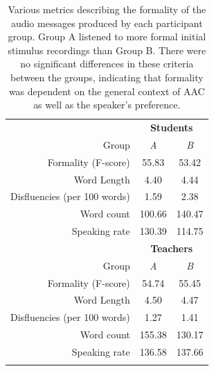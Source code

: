 \begin{table}
	\centering
	\begin{tabular}{r c c}
		\toprule
        & \multicolumn{2}{c}{\textbf{Students}} \\
        Group                        & \textit{A}    & \textit{B}   \\
        Formality (F-score)          & 55.83    & 53.42  \\
        Word Length                  & 4.40     & 4.44   \\
        Disfluencies (per 100 words) & 1.59     & 2.38   \\
        Word count                   & 100.66   & 140.47 \\
        Speaking rate                & 130.39   & 114.75 \\
        \midrule
        & \multicolumn{2}{c}{\textbf{Teachers}} \\
        Group                        & \textit{A}    & \textit{B}   \\
        Formality (F-score)          & 54.74    & 55.45  \\
        Word Length                  & 4.50     & 4.47   \\
        Disfluencies (per 100 words) & 1.27     & 1.41   \\
        Word count                   & 155.38   & 130.17 \\
        Speaking rate                & 136.58   & 137.66 \\
		\bottomrule \\
	\end{tabular}
	\caption{Various metrics describing the formality of the audio messages produced by each participant group. Group A listened to more formal initial stimulus recordings than Group B. There were no significant differences in these criteria between the groups, indicating that formality was dependent on the general context of AAC as well as the speaker's preference.}~\label{tab:formality}
\end{table}

